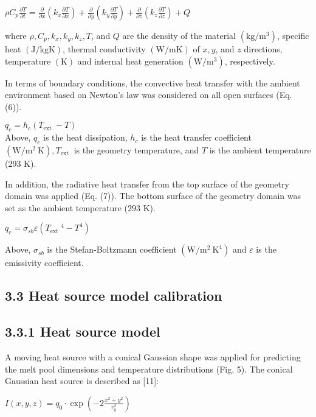 \documentclass[10pt]{article}
\begin{document}
$\rho C_{p} \frac{\partial T}{\partial t}=\frac{\partial}{\partial x}\left(k_{x} \frac{\partial T}{\partial x}\right)+\frac{\partial}{\partial y}\left(k_{y} \frac{\partial T}{\partial y}\right)+\frac{\partial}{\partial z}\left(k_{z} \frac{\partial T}{\partial z}\right)+Q$

where $\rho, C_{p}, k_{x}, k_{y}, k_{z}, T$, and $Q$ are the density of the material $\left(\mathrm{kg} / \mathrm{m}^{3}\right)$, specific heat $(\mathrm{J} / \mathrm{kgK})$, thermal conductivity $(\mathrm{W} / \mathrm{mK})$ of $x, y$, and $z$ directions, temperature $(\mathrm{K})$ and internal heat generation $\left(\mathrm{W} / \mathrm{m}^{3}\right)$, respectively.

In terms of boundary conditions, the convective heat transfer with the ambient environment based on Newton's law was considered on all open surfaces (Eq. (6)).

$q_{c}=h_{c}\left(T_{\text {ext }}-T\right)$\\
Above, $q_{c}$ is the heat dissipation, $h_{c}$ is the heat transfer coefficient $\left(\mathrm{W} / \mathrm{m}^{2} \mathrm{~K}\right), T_{\text {ext }}$ is the geometry temperature, and $T$ is the ambient temperature (293 K).

In addition, the radiative heat transfer from the top surface of the geometry domain was applied (Eq. (7)). The bottom surface of the geometry domain was set as the ambient temperature (293 K).

$q_{r}=\sigma_{s b} \varepsilon\left(T_{\text {ext }}{ }^{4}-T^{4}\right)$

Above, $\sigma_{s b}$ is the Stefan-Boltzmann coefficient $\left(\mathrm{W} / \mathrm{m}^{2} \mathrm{~K}^{4}\right)$ and $\varepsilon$ is the emissivity coefficient.

\subsection*{3.3 Heat source model calibration}
\subsection*{3.3.1 Heat source model}
A moving heat source with a conical Gaussian shape was applied for predicting the melt pool dimensions and temperature distributions (Fig. 5). The conical Gaussian heat source is described as [11]:

$I(x, y, z)=q_{0} \cdot \exp \left(-2 \frac{x^{2}+y^{2}}{r_{0}^{2}}\right)$
\end{document}
